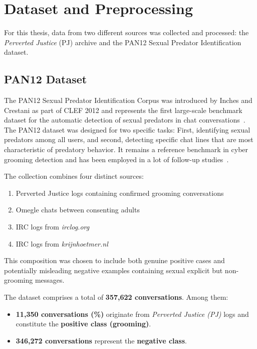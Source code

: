 \chapter{Dataset and Preprocessing}

For this thesis, data from two different sources was collected and processed: the \textit{Perverted Justice} (PJ) archive and the PAN12 Sexual Predator Identification dataset.

\section{PAN12 Dataset}
The PAN12 Sexual Predator Identification Corpus was introduced by Inches and Crestani as part of CLEF 2012 and represents the first large-scale benchmark dataset for the automatic detection of sexual predators in chat conversations~\cite{inches2012pan}. The PAN12 dataset was designed for two specific tasks: First, identifying sexual predators among all users, and second, detecting specific chat lines that are most characteristic of predatory behavior. It remains a reference benchmark in cyber grooming detection and has been employed in a lot of follow-up studies~\cite{inches2012pan}.

The collection combines four distinct sources: 

\begin{enumerate}
    \item Perverted Justice logs containing confirmed grooming conversations
    \item Omegle chats between consenting adults
    \item IRC logs from \textit{irclog.org}
    \item IRC logs from \textit{krijnhoetmer.nl}
\end{enumerate}

 This composition was chosen to include both genuine positive cases and potentially misleading negative examples containing sexual explicit but non-grooming messages.  

The dataset comprises a total of \textbf{357{,}622 conversations}.  
Among them:  
\begin{itemize}
    \item \textbf{11{,}350 conversations (\%)} originate from \textit{Perverted Justice (PJ)} logs and constitute the \textbf{positive class (grooming)}.
    \item \textbf{346{,}272 conversations} represent the \textbf{negative class}.
\end{itemize}

